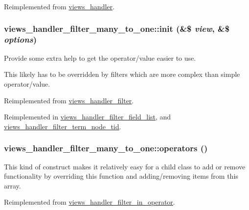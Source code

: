 Reimplemented from \hyperlink{classviews__handler_a947f21ef0f21a77f4d103af4702b3600}{views\_\-handler}.\hypertarget{classviews__handler__filter__many__to__one_aecb4fb4dbe4f93d157cb8a7b699fea22}{
\subsubsection[{init}]{\setlength{\rightskip}{0pt plus 5cm}views\_\-handler\_\-filter\_\-many\_\-to\_\-one::init (\&\$ {\em view}, \/  \&\$ {\em options})}}
\label{classviews__handler__filter__many__to__one_aecb4fb4dbe4f93d157cb8a7b699fea22}
Provide some extra help to get the operator/value easier to use.

This likely has to be overridden by filters which are more complex than simple operator/value. 

Reimplemented from \hyperlink{classviews__handler__filter_a4c1eb0bdb4f81b5a2b2de137e1ffe2cd}{views\_\-handler\_\-filter}.

Reimplemented in \hyperlink{classviews__handler__filter__field__list_a0c04261667d87e0a74c2036a6a62ee75}{views\_\-handler\_\-filter\_\-field\_\-list}, and \hyperlink{classviews__handler__filter__term__node__tid_ab4f316cfbf968a2faa8e574b9df5c4f3}{views\_\-handler\_\-filter\_\-term\_\-node\_\-tid}.\hypertarget{classviews__handler__filter__many__to__one_ae397d071d9f55b4053b88f01572e700f}{
\subsubsection[{operators}]{\setlength{\rightskip}{0pt plus 5cm}views\_\-handler\_\-filter\_\-many\_\-to\_\-one::operators ()}}
\label{classviews__handler__filter__many__to__one_ae397d071d9f55b4053b88f01572e700f}
This kind of construct makes it relatively easy for a child class to add or remove functionality by overriding this function and adding/removing items from this array. 

Reimplemented from \hyperlink{classviews__handler__filter__in__operator_ae22d2c1d388a5b1457960c492ffc1fe1}{views\_\-handler\_\-filter\_\-in\_\-operator}.

